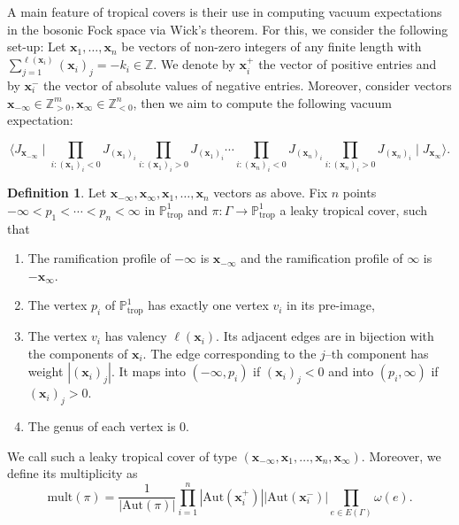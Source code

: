 \documentclass[10pt,a4paper,oneside,no-math,reqno]{amsart}%
\theoremstyle{plain}
\theoremstyle{definition}
\newtheorem{definition}[theorem]{Definition}
\theoremstyle{remark}
\numberwithin{equation}{section}
\newcommand{\1}{\mathds{1}}
\newcommand{\<}{\langle}
\renewcommand{\>}{\rangle}
\begin{document}
A main feature of tropical covers is their use in computing vacuum expectations in the bosonic Fock space via Wick's theorem. For this, we consider the following set-up: Let $\mathbf{x}_1,\dots,\mathbf{x}_n$ be vectors of non-zero integers of any finite length with $\sum_{j=1}^{\ell(\mathbf{x}_i)} (\mathbf{x}_i)_j=-k_i\in\mathbb{Z}$. We denote by $\mathbf{x}_i^+$ the vector of positive entries and by $\mathbf{x}_i^-$ the vector of absolute values of negative entries. Moreover, consider vectors $\mathbf{x}_{-\infty} \in\mathbb{Z}_{>0}^m,\mathbf{x}_\infty \in \mathbb{Z}_{<0}^n$, then we aim to compute the following vacuum expectation:

\begin{equation}
\label{equ:vacc}
    \langle J_{\mathbf{x}_{-\infty}} \mid \prod_{i\colon (\mathbf{x}_1)_i<0} J_{(\mathbf{x}_1)_i} \prod_{i\colon (\mathbf{x}_1)_i>0} J_{(\mathbf{x}_1)_i} \cdots \prod_{i\colon (\mathbf{x}_n)_i<0} J_{(\mathbf{x}_n)_i} \prod_{i\colon (\mathbf{x}_n)_i>0} J_{(\mathbf{x}_n)_i} \mid J_{\mathbf{x}_\infty}\rangle.
\end{equation}

\begin{definition}
   Let $\mathbf{x}_{-\infty},\mathbf{x}_\infty,\mathbf{x}_1,\dots,\mathbf{x}_n$ vectors as above. Fix $n$ points $-\infty<p_1<\cdots<p_n<\infty$ in $\mathbb{P}^1_{\textrm{trop}}$ and $\pi\colon\Gamma\to\mathbb{P}^1_{\textrm{trop}}$ a leaky tropical cover, such that
   \begin{enumerate}
       \item The ramification profile of $-\infty$ is $\mathbf{x}_{-\infty}$ and the ramification profile of $\infty$ is $-\mathbf{x}_\infty$.
       \item The vertex $p_i$ of $\mathbb{P}^1_{\textrm{trop}}$ has exactly one vertex $v_i$ in its pre-image,
       \item The vertex $v_i$ has valency $\ell(\mathbf{x}_i)$. Its adjacent edges are in bijection with the components of $\mathbf{x}_i$. The edge corresponding to the $j$--th component has weight $|(\mathbf{x}_i)_j|$. It maps into $(-\infty,p_i)$ if $(\mathbf{x}_i)_j<0$ and into $(p_i,\infty)$ if $(\mathbf{x}_i)_j>0$.
       \item The genus of each vertex is $0$.
   \end{enumerate}

   We call such a leaky tropical cover of type $(\mathbf{x}_{-\infty},\mathbf{x}_1,\dots,\mathbf{x}_n,\mathbf{x}_\infty)$. Moreover, we define its multiplicity as
   \begin{equation}
       \mathrm{mult}(\pi)
       =
       \frac{1}{|\mathrm{Aut}(\pi)|} \prod_{i=1}^n |\mathrm{Aut}(\mathbf{x}_i^+)| |\mathrm{Aut}(\mathbf{x}_i^-)| \prod_{e\in E(\Gamma)} \omega(e).
   \end{equation}
\end{definition}
\end{document}
